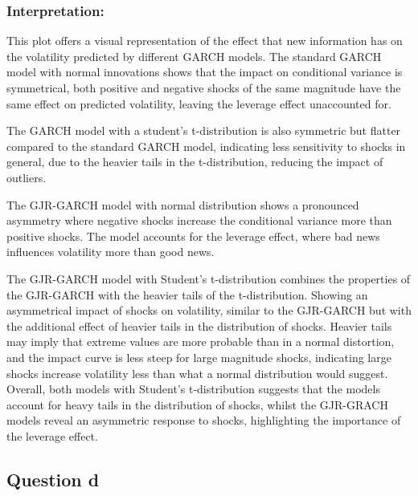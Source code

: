 \documentclass{article}
\begin{document}
\subsubsection*{Interpretation:}
This plot offers a visual representation of the effect that new information has on the volatility predicted by different GARCH models. 
The standard GARCH model with normal innovations shows that the impact on conditional variance is symmetrical, both positive and negative shocks of the same magnitude have the same effect on predicted volatility, leaving the leverage effect unaccounted for. 

The GARCH model with a student's t-distribution is also symmetric but flatter compared to the standard GARCH model, indicating less sensitivity to shocks in general, due to the heavier tails in the t-distribution, reducing the impact of outliers. 

The GJR-GARCH model with normal distribution shows a pronounced asymmetry where negative shocks increase the conditional variance more than positive shocks. 
The model accounts for the leverage effect, where bad news influences volatility more than good news. 

The GJR-GARCH model with Student's t-distribution combines the properties of the GJR-GARCH with the heavier tails of the t-distribution. Showing an asymmetrical impact of shocks on volatility, similar to the GJR-GARCH but with the additional effect of heavier tails in the distribution of shocks. 
Heavier tails may imply that extreme values are more probable than in a normal distortion, and the impact curve is less steep for large magnitude shocks, indicating large shocks increase volatility less than what a normal distribution would suggest. 
Overall, both models with Student's t-distribution suggests that the models account for heavy tails in the distribution of shocks, whilst the GJR-GRACH models reveal an asymmetric response to shocks, highlighting the importance of the leverage effect. 

\subsection*{Question d}
\end{document}
